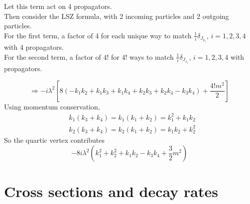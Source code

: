 \documentclass[twoside]{amsart}
\begin{document}
\noindent Let this term act on 4 propagators.  \\
\phantom{Let } Then consider the LSZ formula, with 2 incoming particles and 2 outgoing particles.   \\

\noindent For the first term, a factor of 4 for each unique way to match $\frac{1}{i} \delta_{J_{k_i}}$, $i = 1,2,3,4$ with 4 propagators.  \\
For the second term, a factor of $4!$ for $4!$ ways to match $\frac{1}{i} \delta_{J_{x_i}}$, $i = 1,2,3,4$ with propagators.  

\[
\Longrightarrow -i \lambda^2 \left[ 8 ( - k_1 k_2 + k_1 k_3 + k_1 k_4 + k_2 k_3 + k_2 k_4 - k_3 k_4) + \frac{ 4! m^2 }{2} \right]
\]
Using momentum conservation, 
\[
\begin{aligned}
  & k_1( k_3 +k_4) = k_1(k_1 + k_2) = k_1^2 + k_1 k_2 \\ 
  & k_2(k_3 +k_4) = k_2(k_1 + k_2) = k_1 k_2 + k_2^2 
\end{aligned}
\]
So the quartic vertex contributes
\[
 \boxed{ -8i\lambda^2 ( k_1^2 + k_2^2 + k_1 k_2 - k_3 k_4 + \frac{3}{2} m^2 ) }
\]

\section{Cross sections and decay rates}


\end{document}
